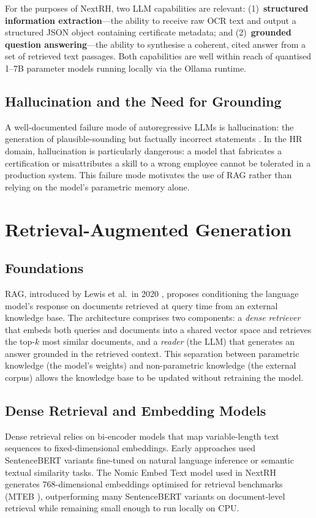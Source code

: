 \documentclass[12pt,a4paper,oneside,openany]{report}
\begin{document}
For the purposes of NextRH, two \ac{LLM} capabilities are relevant: (1)~\textbf{structured information extraction}---the ability to receive raw \ac{OCR} text and output a structured \ac{JSON} object containing certificate metadata; and (2)~\textbf{grounded question answering}---the ability to synthesise a coherent, cited answer from a set of retrieved text passages. Both capabilities are well within reach of quantised 1--7B parameter models running locally via the Ollama runtime.

\subsection{Hallucination and the Need for Grounding}
A well-documented failure mode of autoregressive \acp{LLM} is hallucination: the generation of plausible-sounding but factually incorrect statements \cite{ji2023survey}. In the HR domain, hallucination is particularly dangerous: a model that fabricates a certification or misattributes a skill to a wrong employee cannot be tolerated in a production system. This failure mode motivates the use of \ac{RAG} rather than relying on the model's parametric memory alone.

\section{Retrieval-Augmented Generation}

\subsection{Foundations}
\ac{RAG}, introduced by Lewis et al.\ in 2020 \cite{lewis2020retrieval}, proposes conditioning the language model's response on documents retrieved at query time from an external knowledge base. The architecture comprises two components: a \textit{dense retriever} that embeds both queries and documents into a shared vector space and retrieves the top-$k$ most similar documents, and a \textit{reader} (the \ac{LLM}) that generates an answer grounded in the retrieved context. This separation between parametric knowledge (the model's weights) and non-parametric knowledge (the external corpus) allows the knowledge base to be updated without retraining the model.

\subsection{Dense Retrieval and Embedding Models}
Dense retrieval relies on bi-encoder models that map variable-length text sequences to fixed-dimensional embeddings. Early approaches used SentenceBERT \cite{reimers2019sentencebert} variants fine-tuned on natural language inference or semantic textual similarity tasks. The Nomic Embed Text model \cite{nussbaum2024nomic} used in NextRH generates 768-dimensional embeddings optimised for retrieval benchmarks (MTEB \cite{muennighoff2022mteb}), outperforming many SentenceBERT variants on document-level retrieval while remaining small enough to run locally on \ac{CPU}.
\end{document}
